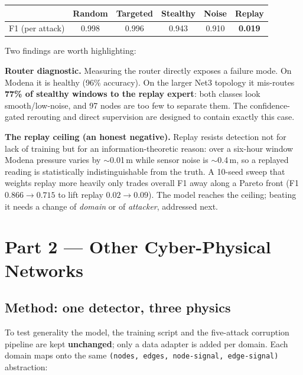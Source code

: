 \documentclass[11pt,a4paper]{article}
\begin{document}
\begin{center}\small
\begin{tabularx}{\linewidth}{@{}l CCCCC@{}}
\toprule
 & Random & Targeted & Stealthy & Noise & Replay \\
\midrule
F1 (per attack) & 0.998 & 0.996 & 0.943 & 0.910 & \textbf{0.019} \\
\bottomrule
\end{tabularx}
\end{center}

Two findings are worth highlighting:

\textbf{Router diagnostic.} Measuring the router directly exposes a failure
mode. On Modena it is healthy (96\% accuracy). On the larger Net3 topology
it mis-routes \textbf{77\% of stealthy windows to the replay expert}: both
classes look smooth/low-noise, and 97 nodes are too few to separate them.
The confidence-gated rerouting and direct supervision are designed to
contain exactly this case.

\textbf{The replay ceiling (an honest negative).} Replay resists
detection not for lack of training but for an information-theoretic
reason: over a six-hour window Modena pressure varies by
$\sim$0.01\,m while sensor noise is $\sim$0.4\,m, so a replayed reading is
statistically indistinguishable from the truth. A 10-seed sweep that
weights replay more heavily only trades overall F1 away along a Pareto
front (F1 $0.866\!\to\!0.715$ to lift replay $0.02\!\to\!0.09$). The model
reaches the ceiling; beating it needs a change of \emph{domain} or of
\emph{attacker}, addressed next.

\section{Part 2 --- Other Cyber-Physical Networks}

\subsection{Method: one detector, three physics}
To test generality the model, the training script and the five-attack
corruption pipeline are kept \textbf{unchanged}; only a data adapter is
added per domain. Each domain maps onto the same
\texttt{(nodes, edges, node-signal, edge-signal)} abstraction:
\end{document}
